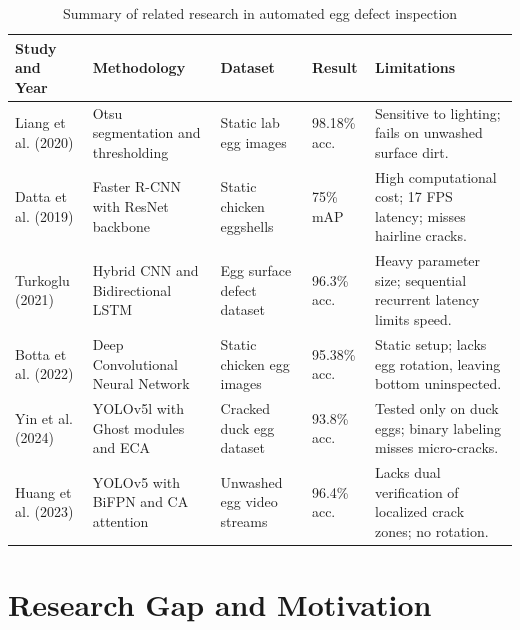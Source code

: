 \documentclass[12pt,a4paper]{report}
\begin{document}
\begin{table}[H]
\centering
\caption{Summary of related research in automated egg defect inspection}
\label{tab:literature_survey}
\vspace{0.2cm}
\setlength{\tabcolsep}{4pt}
\renewcommand{\arraystretch}{1.15}
\small
\begin{tabular}{p{2.8cm} p{2.6cm} p{2.4cm} p{1.8cm} p{4.6cm}}
\toprule
\textbf{Study and Year} & \textbf{Methodology} & \textbf{Dataset} & \textbf{Result} & \textbf{Limitations} \\
\midrule
Liang et al. (2020) & Otsu segmentation and thresholding & Static lab egg images & 98.18\% acc. & Sensitive to lighting; fails on unwashed surface dirt. \\
\midrule
Datta et al. (2019) & Faster R-CNN with ResNet backbone & Static chicken eggshells & 75\% mAP & High computational cost; 17 FPS latency; misses hairline cracks. \\
\midrule
Turkoglu (2021) & Hybrid CNN and Bidirectional LSTM & Egg surface defect dataset & 96.3\% acc. & Heavy parameter size; sequential recurrent latency limits speed. \\
\midrule
Botta et al. (2022) & Deep Convolutional Neural Network & Static chicken egg images & 95.38\% acc. & Static setup; lacks egg rotation, leaving bottom uninspected. \\
\midrule
Yin et al. (2024) & YOLOv5l with Ghost modules and ECA & Cracked duck egg dataset & 93.8\% acc. & Tested only on duck eggs; binary labeling misses micro-cracks. \\
\midrule
Huang et al. (2023) & YOLOv5 with BiFPN and CA attention & Unwashed egg video streams & 96.4\% acc. & Lacks dual verification of localized crack zones; no rotation. \\
\bottomrule
\end{tabular}
\end{table}

\section{Research Gap and Motivation}
\end{document}
